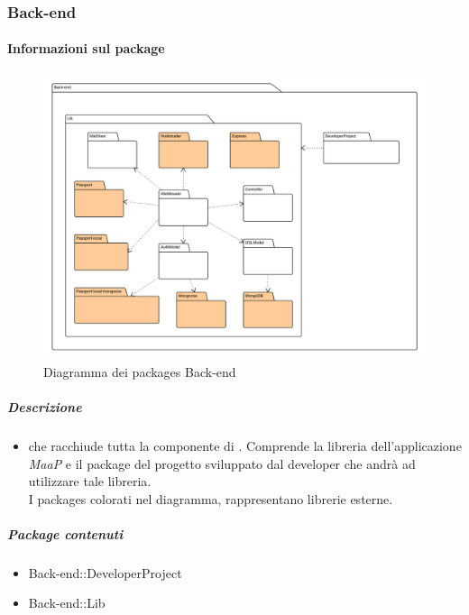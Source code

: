 
  \subsubsection{Back-end}
  \paragraph{Informazioni sul package} 
    \begin{figure}[H] 
      \begin{center} 
        \includegraphics[width=\textwidth]{uml/Back-end-Diagramma dei Packages.png}  
        \caption{Diagramma dei packages Back-end}
      \end{center}  
    \end{figure} 
  \subparagraph{Descrizione} 
    \begin{itemize}
    \item[]  che racchiude tutta la componente di . Comprende la libreria dell'applicazione \textit{MaaP} e il package del progetto sviluppato dal developer che andrà ad utilizzare tale libreria. \\ I packages colorati nel diagramma, rappresentano librerie esterne.
    \end{itemize} 
    \subparagraph{Package contenuti} 
    \begin{itemize}
        \item Back-end::DeveloperProject
        \item Back-end::Lib
    \end{itemize}
    
